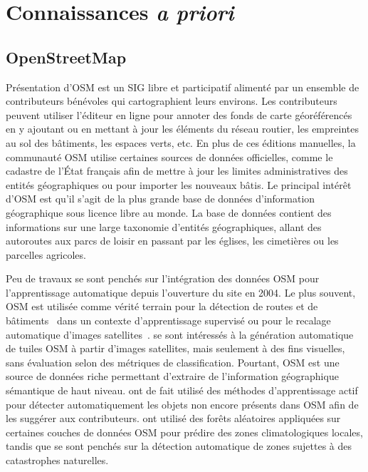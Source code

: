 \section{Connaissances \textit{a priori}}

\subsection{OpenStreetMap}

Présentation d'OSM
 est un \gls{SIG} libre et participatif alimenté par un ensemble de contributeurs bénévoles qui cartographient leurs environs. Les contributeurs peuvent utiliser l'éditeur en ligne pour annoter des fonds de carte géoréférencés en y ajoutant ou en mettant à jour les éléments du réseau routier, les empreintes au sol des bâtiments, les espaces verts, etc. En plus de ces éditions manuelles, la communauté \gls{OSM} utilise certaines sources de données officielles, comme le cadastre de l'État français afin de mettre à jour les limites administratives des entités géographiques ou pour importer les nouveaux bâtis. Le principal intérêt d'\gls{OSM} est qu'il s'agit de la plus grande base de données d'information géographique sous licence libre au monde. La base de données contient des informations sur une large taxonomie d'entités géographiques, allant des autoroutes aux parcs de loisir en passant par les églises, les cimetières ou les parcelles agricoles.

Peu de travaux se sont penchés sur l'intégration des données \gls{OSM} pour l'apprentissage automatique depuis l'ouverture du site en 2004. Le plus souvent, \gls{OSM} est utilisée comme vérité terrain pour la détection de routes et de bâtiments~\cite{mnih_machine_2013,maggiori_learning_2017} dans un contexte d'apprentissage supervisé ou pour le recalage automatique d'images satellites~\cite{vakalopoulou_simultaneous_2016}. \citet{isola_image--image_2016} se sont intéressés à la génération automatique de tuiles \gls{OSM} à partir d'images satellites, mais seulement à des fins visuelles, sans évaluation selon des métriques de classification. Pourtant, \gls{OSM} est une source de données riche permettant d'extraire de l'information géographique sémantique de haut niveau. \citet{chen_deepvgi_2017} ont de fait utilisé des méthodes d'apprentissage actif pour détecter automatiquement les objets non encore présents dans \gls{OSM} afin de les suggérer aux contributeurs. \citet{danylo_contributing_2016} ont utilisé des forêts aléatoires appliquées sur certaines couches de données \gls{OSM} pour prédire des zones climatologiques locales, tandis que \citet{geis_joint_2017} se sont penchés sur la détection automatique de zones sujettes à des catastrophes naturelles.

